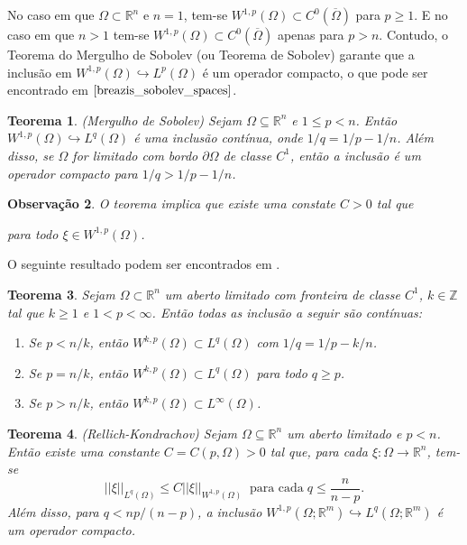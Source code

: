 \documentclass[12pt]{book}
\newtheorem{teorema}{Teorema}[section]
\newtheorem{observacao}[teorema]{Observação}
\newcommand{\espacoLp}[1]{L^{p}(#1)}
\newcommand{\espacoLpGeral}[2]{L^{#1}(#2)}
\newcommand{\espacosobolev}[1]{W^{1,p}(#1)}
\newcommand{\espacosobolevcontradominio}[2]{W^{1,p}(#1;#2)}
\newcommand{\espacosobolevgeneralizado}[1]{W^{k,p}(#1)}
\newcommand{\inteiros}{\mathbb{Z}}
\newcommand{\norma}[1]{||#1||}
\newcommand{\normaLgGeral}[3]{\norma{#1}_{\espacoLpGeral{#2}{#3}}}
\newcommand{\normaWpGeralDominio}[3]{\norma{#1}_{W^{1,#2}(#3)}}
\newcommand{\real}[1]{\mathbb{R}^{#1}}
\begin{document}
	No caso em que $\Omega\subset\real{n}$ e $n=1$, tem-se $\espacosobolev{\Omega} \subset C^{0}(\overline{\Omega})$ para $p \geq 1$. E no caso em que $n>1$ tem-se $\espacosobolev{\Omega} \subset C^{0}(\overline{\Omega})$ apenas para $p>n$. Contudo, o Teorema do Mergulho de Sobolev (ou Teorema de Sobolev) garante que a inclusão em $\espacosobolev{\Omega}\hookrightarrow \espacoLp{\Omega}$ é um operador compacto, o que pode ser encontrado em $\cite{breazis_sobolev_spaces}$.	
	
	\begin{teorema}\label{teorema_sobolev}
		(Mergulho de Sobolev) Sejam $\Omega \subseteq \real{n}$ e $1 \leq p < n$. Então $\espacosobolev{\Omega} \hookrightarrow L^{q}(\Omega)$ é uma inclusão contínua, onde $1/q = 1/p -1/n$. Além disso, se $\Omega$ for limitado com bordo $\partial\Omega$ de classe $C^{1}$, então a inclusão é um operador compacto para $1/q>1/p -1/n$.
	\end{teorema}
	

	\begin{observacao}
		O teorema implica que existe uma constate $C>0$ tal que 
	
		para todo $\xi\in \espacosobolev{\Omega}$.
	\end{observacao}
	
	O seguinte resultado podem ser encontrados em \cite{audi_floer_homology}.
	
	
	
	\begin{teorema}\label{teorema_inclusao_sobolev}
		Sejam $\Omega \subset\real{n}$ um aberto limitado com fronteira de classe $C^{1}$, $k\in \inteiros$ tal que $k\geq 1$ e $1<p <\infty$. Então todas as inclusão a seguir são contínuas:
		\begin{enumerate}
			\item Se $p<n/k$, então $\espacosobolevgeneralizado{\Omega}\subset \espacoLpGeral{q}{\Omega} $ com $1/q=1/p - k/n$.
			
			\item Se $p=n/k$, então $\espacosobolevgeneralizado{\Omega}\subset \espacoLpGeral{q}{\Omega} $ para todo $q\geq p$.
			
			\item\label{item_tres_teorema_inclusao_sobolev} Se $p>n/k$, então $\espacosobolevgeneralizado{\Omega}\subset \espacoLpGeral{\infty}{\Omega} $.
		\end{enumerate}
	\end{teorema}
	
	\begin{teorema}\label{teorema_rellich}
		(Rellich-Kondrachov) Sejam $\Omega \subseteq \real{n}$ um aberto limitado e $p<n$. Então existe uma constante $C=C(p,\Omega)>0$ tal que, para cada $\xi: \Omega \to \real{n}$, tem-se 
		$$
		\normaLgGeral{\xi}{q}{\Omega} \leq C \normaWpGeralDominio{\xi}{p}{\Omega}\;\;\text{para cada}\; q\leq \frac{n}{n-p}.
		$$
		Além disso, para $q<np/(n-p)$, a inclusão $\espacosobolevcontradominio{\Omega}{\real{m}} \hookrightarrow \espacoLpGeral{q}{\Omega;\real{m}}$ é um operador compacto.
	\end{teorema}
	
\end{document}

